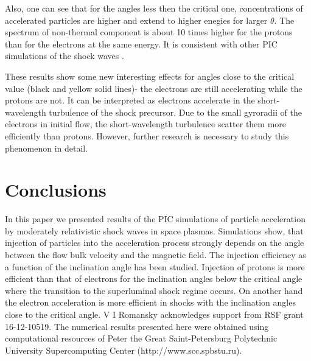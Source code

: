 \documentclass[a4paper]{jpconf}
\begin{document}
Also, one can see that for the angles less then the critical one, concentrations of accelerated particles are higher and extend to higher enegies for larger $\theta$. The spectrum of non-thermal component is about 10 times higher for the protons than for the electrons at the same energy. It is consistent with other PIC simulations of the shock waves {\cite{Sironi2011}}.

These results show some new interesting effects for angles close to the critical value (black and yellow solid lines)- the electrons are still accelerating while the protons are not. It can be interpreted as electrons accelerate in the short-wavelength turbulence of the shock precursor. Due to the small gyroradii of the electrons in initial flow, the short-wavelength turbulence scatter them more efficiently than protons. However, further research is necessary to study this phenomenon in detail.


\section{Conclusions}
In this paper we presented results of the PIC simulations of particle acceleration by moderately relativistic shock waves in space plasmas. Simulations show, that injection of particles into the acceleration process strongly depends on the angle between the flow bulk velocity and the magnetic field. The injection efficiency as a function of the inclination angle has been studied. Injection of protons is more efficient than that of electrons for the inclination angles below the critical angle where the transition to the superluminal shock regime occurs. On  another hand the electron acceleration is more efficient in shocks with the inclination angles close to the critical angle.
\ack
V I Romansky acknowledges support from RSF grant 16-12-10519.
The numerical results presented here were obtained using computational resources of Peter the Great Saint-Petersburg Polytechnic University Supercomputing Center (http://www.scc.spbstu.ru). 
\end{document}

